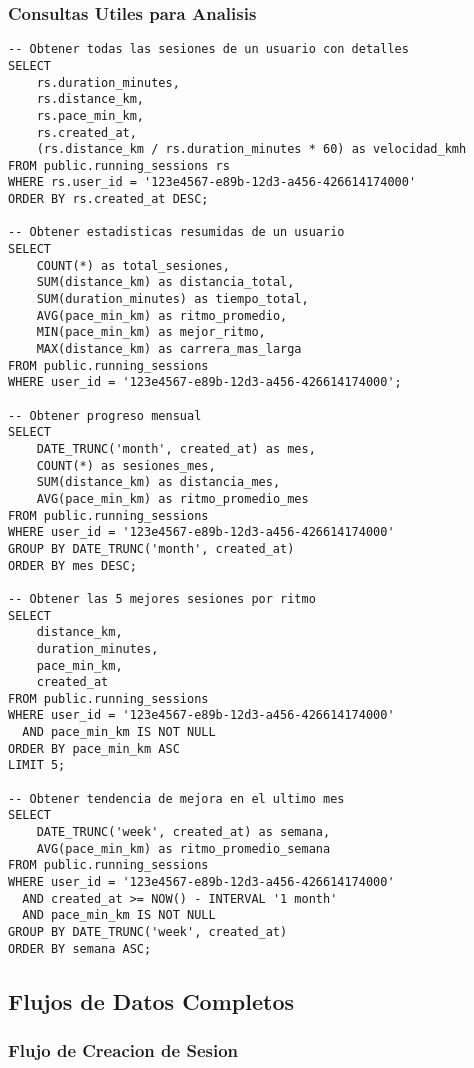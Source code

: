 \documentclass[12pt,a4paper]{article}
\begin{document}
\subsubsection{Consultas Utiles para Analisis}

\begin{lstlisting}[style=sqlstyle, caption=Consultas utiles para analisis de running]
-- Obtener todas las sesiones de un usuario con detalles
SELECT 
    rs.duration_minutes,
    rs.distance_km,
    rs.pace_min_km,
    rs.created_at,
    (rs.distance_km / rs.duration_minutes * 60) as velocidad_kmh
FROM public.running_sessions rs
WHERE rs.user_id = '123e4567-e89b-12d3-a456-426614174000'
ORDER BY rs.created_at DESC;

-- Obtener estadisticas resumidas de un usuario
SELECT 
    COUNT(*) as total_sesiones,
    SUM(distance_km) as distancia_total,
    SUM(duration_minutes) as tiempo_total,
    AVG(pace_min_km) as ritmo_promedio,
    MIN(pace_min_km) as mejor_ritmo,
    MAX(distance_km) as carrera_mas_larga
FROM public.running_sessions
WHERE user_id = '123e4567-e89b-12d3-a456-426614174000';

-- Obtener progreso mensual
SELECT 
    DATE_TRUNC('month', created_at) as mes,
    COUNT(*) as sesiones_mes,
    SUM(distance_km) as distancia_mes,
    AVG(pace_min_km) as ritmo_promedio_mes
FROM public.running_sessions
WHERE user_id = '123e4567-e89b-12d3-a456-426614174000'
GROUP BY DATE_TRUNC('month', created_at)
ORDER BY mes DESC;

-- Obtener las 5 mejores sesiones por ritmo
SELECT 
    distance_km,
    duration_minutes,
    pace_min_km,
    created_at
FROM public.running_sessions
WHERE user_id = '123e4567-e89b-12d3-a456-426614174000'
  AND pace_min_km IS NOT NULL
ORDER BY pace_min_km ASC
LIMIT 5;

-- Obtener tendencia de mejora en el ultimo mes
SELECT 
    DATE_TRUNC('week', created_at) as semana,
    AVG(pace_min_km) as ritmo_promedio_semana
FROM public.running_sessions
WHERE user_id = '123e4567-e89b-12d3-a456-426614174000'
  AND created_at >= NOW() - INTERVAL '1 month'
  AND pace_min_km IS NOT NULL
GROUP BY DATE_TRUNC('week', created_at)
ORDER BY semana ASC;
\end{lstlisting}

\subsection{Flujos de Datos Completos}

\subsubsection{Flujo de Creacion de Sesion}
\end{document}
